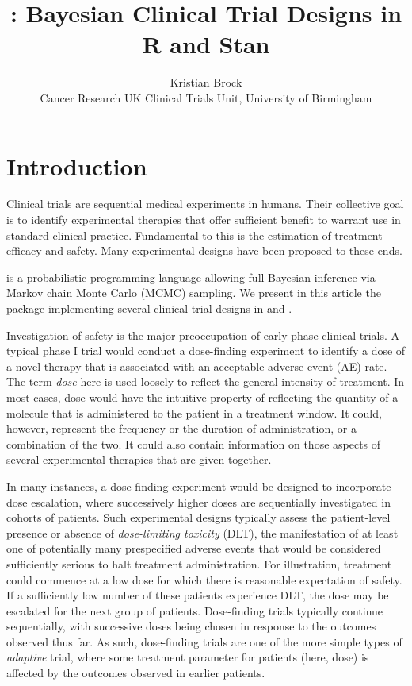 \documentclass[article]{jss}
\author{
Kristian Brock\\Cancer Research UK Clinical Trials Unit, University of Birmingham
}
\title{\pkg{trialr}: Bayesian Clinical Trial Designs in R and Stan}
\begin{document}
\hypertarget{introduction}{%
\section{Introduction}\label{introduction}}

Clinical trials are sequential medical experiments in humans. Their
collective goal is to identify experimental therapies that offer
sufficient benefit to warrant use in standard clinical practice.
Fundamental to this is the estimation of treatment efficacy and safety.
Many experimental designs have been proposed to these ends.

 \citep{Carpenter2016} is a probabilistic programming
language allowing full Bayesian inference via Markov chain Monte Carlo
(MCMC) sampling. We present in this article the  package
implementing several clinical trial designs in  and
.

Investigation of safety is the major preoccupation of early phase
clinical trials. A typical phase I trial would conduct a dose-finding
experiment to identify a dose of a novel therapy that is associated with
an acceptable adverse event (AE) rate. The term \textit{dose} here is
used loosely to reflect the general intensity of treatment. In most
cases, dose would have the intuitive property of reflecting the quantity
of a molecule that is administered to the patient in a treatment window.
It could, however, represent the frequency or the duration of
administration, or a combination of the two. It could also contain
information on those aspects of several experimental therapies that are
given together.

In many instances, a dose-finding experiment would be designed to
incorporate dose escalation, where successively higher doses are
sequentially investigated in cohorts of patients. Such experimental
designs typically assess the patient-level presence or absence of
\textit{dose-limiting toxicity} (DLT), the manifestation of at least one
of potentially many prespecified adverse events that would be considered
sufficiently serious to halt treatment administration. For illustration,
treatment could commence at a low dose for which there is reasonable
expectation of safety. If a sufficiently low number of these patients
experience DLT, the dose may be escalated for the next group of
patients. Dose-finding trials typically continue sequentially, with
successive doses being chosen in response to the outcomes observed thus
far. As such, dose-finding trials are one of the more simple types of
\textit{adaptive} trial, where some treatment parameter for patients
(here, dose) is affected by the outcomes observed in earlier patients.
\end{document}
